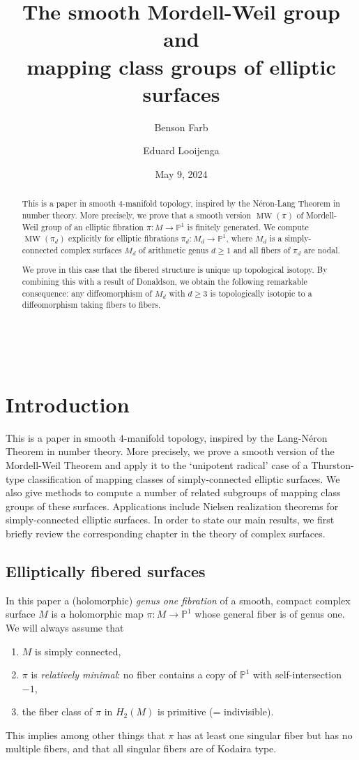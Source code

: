 \documentclass[10pt,letterpaper]{amsart}
\title[The smooth Mordell-Weil group]{\vspace{-.6in}The smooth Mordell-Weil group and \\ mapping class groups of elliptic surfaces}
\author{Benson Farb}
\author{Eduard Looijenga}
\date{May 9, 2024}
\numberwithin{equation}{section}
\def\PP{{\mathbb P}}
\def\Pb{{\mathbb P}}
\newcommand\MW{\operatorname{MW}}
\theoremstyle{remark}
\begin{document}
\

\begin{abstract}
This is a paper in smooth $4$-manifold topology, inspired by the 
N\'{e}ron-Lang Theorem in number theory.  More precisely, we prove 
that a smooth version $\MW(\pi)$ of Mordell-Weil group  of an elliptic fibration $\pi:M\to\Pb^1$ is finitely generated.  We compute $\MW(\pi_d)$ 
explicitly for elliptic fibrations $\pi_d:M_d\to\Pb^1$, where $M_d$ 
is a simply-connected complex surfaces $M_d$ of arithmetic genus 
$d\geq 1$ and all fibers of $\pi_d$ are nodal.

We prove in this case that the fibered structure is unique up  topological isotopy.  By combining  this with a result of Donaldson, we obtain the following remarkable consequence: any diffeomorphism of $M_d$ with $d\geq 3$ is topologically isotopic to a diffeomorphism taking fibers to fibers.
\end{abstract}

\maketitle

\vspace{-.3in}
\tableofcontents

\section{Introduction} 
This is a paper in smooth $4$-manifold topology, inspired by the 
Lang-N\'{e}ron Theorem in number theory.  More precisely, we prove a smooth version of the Mordell-Weil Theorem and apply it to the 
`unipotent radical' case of a Thurston-type classification of mapping classes of simply-connected elliptic surfaces.  We also give methods to compute a number of related subgroups of mapping class groups of 
these surfaces.   Applications include Nielsen realization theorems for simply-connected elliptic surfaces. In order to state our main results, we first briefly  review the corresponding chapter in the theory of complex surfaces.

\subsection{Elliptically fibered surfaces}\label{subsect:1.1} In this paper a  (holomorphic) {\em genus one fibration} of a smooth, compact complex surface $M$ is a holomorphic map $\pi:M\to\Pb^1$ whose general fiber is of genus one. We will always assume that 
\begin{enumerate}
\item $M$ is simply connected,
\item $\pi$ is {\em relatively minimal}:  no fiber contains a  copy of $\PP^1$ with  self-intersection $-1$, 
\item the fiber class of $\pi$  in $H_2(M)$ is primitive (= indivisible).
\end{enumerate}
 This implies among other things that $\pi$ has at least one singular fiber but has no multiple fibers, and  that all singular fibers are of Kodaira type. 
\end{document}
